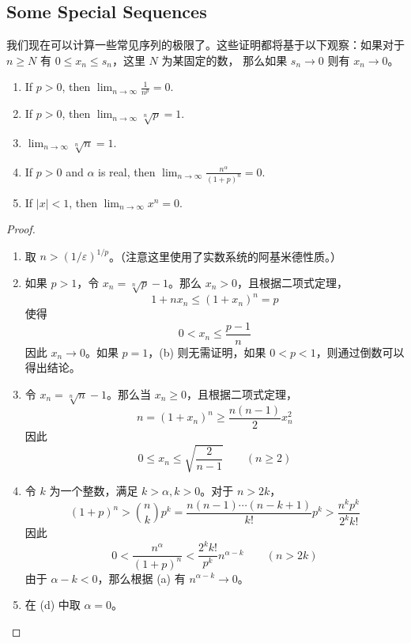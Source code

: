 \documentclass[../poma-notes.tex]{subfiles}
\begin{document}
\subsection*{Some Special Sequences}

我们现在可以计算一些常见序列的极限了。这些证明都将基于以下观察：如果对于 $n \ge N$ 有 $0 \le x_n \le s_n$，这里 $N$ 为某固定的数，
那么如果 $s_n \to 0$ 则有 $x_n \to 0$。

\begin{theorem}\mbox{}
  \begin{enumerate}[label=(\alph*)]
    \item If $p > 0$, then $\lim_{n \to \infty} \frac{1}{n^p} = 0$.
    \item If $p > 0$, then $\lim_{n \to \infty} \sqrt[n]{p} = 1$.
    \item $\lim_{n \to \infty} \sqrt[n]{n} = 1$.
    \item If $p > 0$ and $\alpha$ is real, then $\lim_{n \to \infty} \frac{n^{\alpha}}{(1 + p)^n} = 0$.
    \item If $|x| < 1$, then $\lim_{n \to \infty} x^n = 0$.
  \end{enumerate}
\end{theorem}

\begin{proof}
  \begin{enumerate}[label=(\alph*)]
    \item 取 $n > (1/\varepsilon)^{1/p}$。（注意这里使用了实数系统的阿基米德性质。）
    \item 如果 $p > 1$，令 $x_n = \sqrt[n]{p} - 1$。那么 $x_n > 0$，且根据二项式定理，
          \[ 1 + nx_n \le (1 + x_n)^n = p \]
          使得
          \[ 0 < x_n \le \frac{p-1}{n} \]
          因此 $x_n \to 0$。如果 $p = 1$，(b) 则无需证明，如果 $0 < p < 1$，则通过倒数可以得出结论。
    \item 令 $x_n = \sqrt[n]{n} - 1$。那么当 $x_n \ge 0$，且根据二项式定理，
          \[ n = (1 + x_n)^n \ge \frac{n(n-1)}{2} x_n^2 \]
          因此
          \[ 0 \le x_n \le \sqrt{\frac{2}{n-1}} \qquad (n \ge 2) \]
    \item 令 $k$ 为一个整数，满足 $k > \alpha, k > 0$。对于 $n > 2k$，
          \[ (1+p)^n>\binom{n}{k}p^k=\frac{n(n-1)\cdots(n-k+1)}{k!}p^k>\frac{n^kp^k}{2^kk!}  \]
          因此
          \[ 0 < \frac{n^{\alpha}}{(1+p)^n} < \frac{2^kk!}{p^k} n^{\alpha-k} \qquad (n>2k)\]
          由于 $\alpha - k < 0$，那么根据 (a) 有 $n^{\alpha-k} \to 0$。
    \item 在 (d) 中取 $\alpha = 0$。
  \end{enumerate}
\end{proof}
\end{document}
